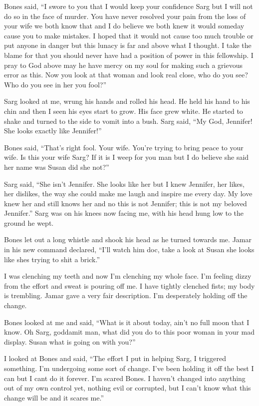 Bones said, ``I swore to you that I would keep your confidence Sarg but I will not do so in the face of murder. You have never resolved your pain from the loss of your wife we both know that and I do believe we both knew it would someday cause you to make mistakes. I hoped that it would not cause too much trouble or put anyone in danger but this lunacy is far and above what I thought. I take the blame for that you should never have had a position of power in this fellowship. I pray to God above may he have mercy on my soul for making such a grievous error as this. Now you look at that woman and look real close, who do you see? Who do you see in her you fool?''

Sarg looked at me, wrung his hands and rolled his head. He held his hand to his chin and then I seen his eyes start to grow. His face grew white. He started to shake and turned to the side to vomit into a bush. Sarg said, ``My God, Jennifer! She looks exactly like Jennifer!''

Bones said, ``That's right fool. Your wife. You're trying to bring peace to your wife. Is this your wife Sarg? If it is I weep for you man but I do believe she said her name was Susan did she not?''

Sarg said, ``She isn't Jennifer. She looks like her but I knew Jennifer, her likes, her dislikes, the way she could make me laugh and inspire me every day. My love knew her and still knows her and no this is not Jennifer; this is not my beloved Jennifer.'' Sarg was on his knees now facing me, with his head hung low to the ground he wept.

Bones let out a long whistle and shook his head as he turned towards me. Jamar in his new command declared, ``I'll watch him doc, take a look at Susan she looks like shes trying to shit a brick.''

I was clenching my teeth and now I'm clenching my whole face. I'm feeling dizzy from the effort and sweat is pouring off me. I have tightly clenched fists; my body is trembling. Jamar gave a very fair description. I'm desperately holding off the change.

Bones looked at me and said, ``What is it about today, ain't no full moon that I know. Oh Sarg, goddamit man, what did you do to this poor woman in your mad display. Susan what is going on with you?''

I looked at Bones and said, ``The effort I put in helping Sarg, I triggered something. I'm undergoing some sort of change. I've been holding it off the best I can but I cant do it forever. I'm scared Bones. I haven't changed into anything out of my own control yet, nothing evil or corrupted, but I can't know what this change will be and it scares me.''

